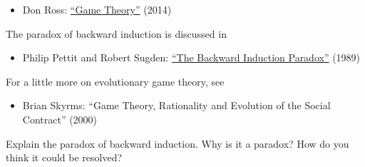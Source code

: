 \begin{itemize}
\item Don Ross: \href{https://plato.stanford.edu/entries/game-theory/}{``Game Theory''} (2014)
\end{itemize}

The paradox of backward induction is discussed in
\begin{itemize}
\item Philip Pettit and Robert Sugden: \href{https://www.princeton.edu/~ppettit/papers/BackwardInduction_JournalofPhilosophy_1989.pdf}{``The Backward Induction Paradox''} (1989)
\end{itemize}

For a little more on evolutionary game theory, see

\begin{itemize}
\item Brian Skyrms: ``Game Theory, Rationality and Evolution of the Social Contract'' (2000) 
\end{itemize}

\begin{essay}
  Explain the paradox of backward induction. Why is it a paradox? How
  do you think it could be resolved?
\end{essay}


